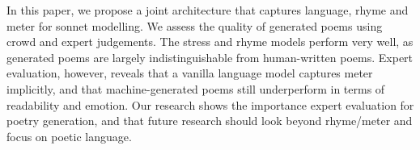 In this paper, we propose a joint architecture that captures language, rhyme and meter for sonnet modelling.  We assess the quality of generated poems using crowd and expert judgements.  The stress and rhyme models perform very well, as generated poems are largely indistinguishable from human-written poems.  Expert evaluation, however, reveals that a vanilla language model captures meter implicitly, and that machine-generated poems still underperform in terms of readability and emotion. Our research shows the importance expert evaluation for poetry generation, and that future research should look beyond rhyme/meter and focus on poetic language.

